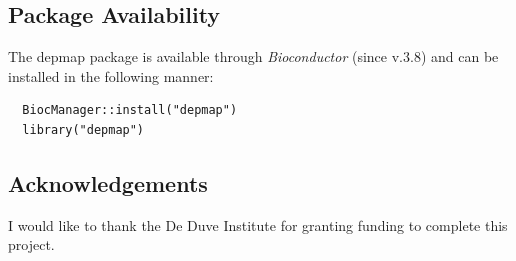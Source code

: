 \documentclass{article}
\newcommand{\hcode}[2][lgray]{{\ttfamily\color{vdgray}\colorbox{#1}{#2}}}
\begin{document}
\begin{multicols}{2}
\begin{minipage}[t]{\linewidth}
  \subsection*{Package Availability}
  \large
  The \hcode{depmap} package is available through \textit{Bioconductor} (since v.3.8) and can be installed in the following manner:
  \begin{lstlisting}
  BiocManager::install("depmap")
  library("depmap")
  \end{lstlisting}
  \subsection*{Acknowledgements}
  \large
I would like to thank the De Duve Institute for granting funding to complete this project.
\vspace{0.15cm}
\end{minipage}

\scriptsize
 


\end{multicols}
\end{document}

